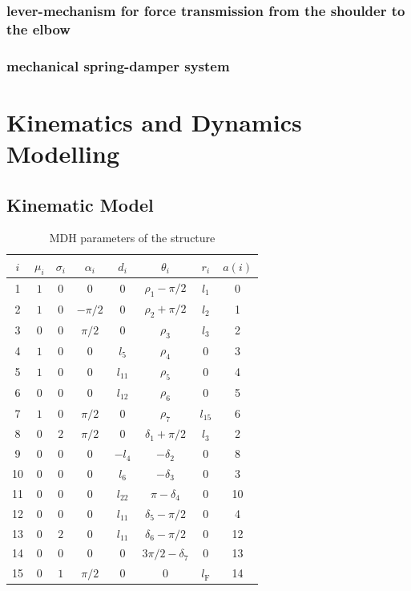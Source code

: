 \documentclass[letterpaper, 10 pt, conference]{ieeeconf}  %
\begin{document}
\subsubsection{lever-mechanism for force transmission from the shoulder to the elbow}

\subsubsection{mechanical spring-damper system}

\section{Kinematics and Dynamics Modelling}

\subsection{Kinematic Model}

\begin{table}
\begin{tabular}[t]{|c||c|c||c|c|c|c|c|}
    \hline
    $i$ & $\mu_i$ & $\sigma_i$ & $\alpha_i$ & $d_i$ & $\theta_i$ & $r_i$ & $a(i)$ \\
    \hline
     1 & $1$ & $0$ & $0$ & $0$ & $\rho_1-\pi/2$ & $l_1$ & 0 \\
     2 & $1$ & $0$ & $-\pi/2$ & $0$ & $\rho_2+\pi/2$ & $l_2$ & 1 \\
     3 & $0$ & $0$ & $\pi/2$ & $0$ & $\rho_3$ & $l_3$ & 2 \\
     4 & $1$ & $0$ & $0$ & $l_5$ & $\rho_4$ & $0$ & 3 \\
     5 & $1$ & $0$ & $0$ & $l_{11}$ & $\rho_5$ & $0$ & 4 \\
     6 & $0$ & $0$ & $0$ & $l_{12}$ & $\rho_6$ & $0$ & 5 \\
     7 & $1$ & $0$ & $\pi/2$ & $0$ & $\rho_7$ & $l_{15}$ & 6 \\
     8 & $0$ & $2$ & $\pi/2$ & $0$ & $\delta_{1}+\pi/2$ & $l_{3}$ & 2 \\
     9 & $0$ & $0$ & $0$ & $-l_{4}$ & $-\delta_{2}$ & $0$ & 8 \\
    10 & $0$ & $0$ & $0$ & $l_{6}$ & $-\delta_{3}$ & $0$ & 3 \\
    11 & $0$ & $0$ & $0$ & $l_{22}$ & $\pi-\delta_{4}$ & $0$ & 10 \\
    12 & $0$ & $0$ & $0$ & $l_{11}$ & $\delta_{5}-\pi/2$ & $0$ & 4 \\
    13 & $0$ & $2$ & $0$ & $l_{11}$ & $\delta_{6}-\pi/2$ & $0$ & 12 \\
    14 & $0$ & $0$ & $0$ & $0$ & $3\pi/2-\delta_{7}$ & $0$ & 13 \\
    15 & $0$ & $1$ & $\pi/2$ & $0$ & $0$ & $l_{\mathrm{F}}$ & 14 \\
    \hline
\end{tabular}
\caption{MDH parameters of the structure}
\end{table}
\end{document}
